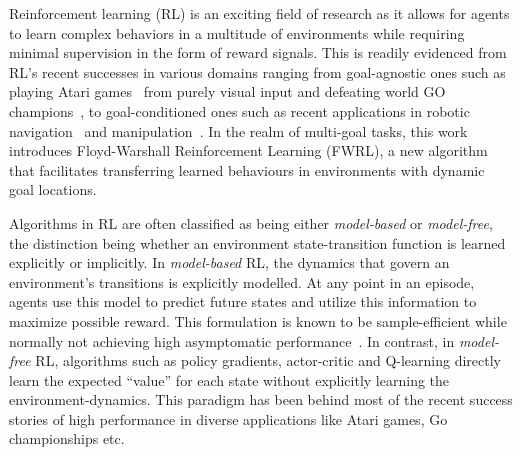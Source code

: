 Reinforcement learning (RL) is an exciting field of research as it allows for
agents to learn complex behaviors in a multitude of environments while requiring
minimal supervision in the form of reward signals. This is readily
evidenced from RL's recent successes in various domains ranging from goal-agnostic ones such as  
playing Atari games~\cite{MnKaSiNATURE2015} from purely visual input and defeating world GO
champions~\cite{gibney2016google}, to goal-conditioned ones such as recent
applications in robotic navigation~\cite{mirowski2018learning} and
manipulation~\cite{pong2018temporal}. In the realm of multi-goal tasks, this
work introduces Floyd-Warshall Reinforcement Learning (FWRL), a new algorithm
that facilitates transferring learned behaviours in environments with dynamic goal
locations.


Algorithms in RL are often classified as being either
\emph{model-based} or \emph{model-free}, the distinction being whether
an environment state-transition function is learned explicitly or
implicitly.  In \emph{model-based} RL, the dynamics that govern an
environment's transitions is explicitly modelled.
At any point in an episode, agents use this model to
predict future states and utilize this information to maximize possible
reward. This formulation is known to be sample-efficient while normally
not achieving high asymptomatic performance~\cite{pong2018temporal}.
In contrast, in \emph{model-free} RL, algorithms such as policy gradients,
actor-critic and Q-learning directly learn the expected ``value'' for each
state without explicitly learning the environment-dynamics. This paradigm has
been behind most of the recent success stories of high performance in diverse
applications like Atari games, Go championships etc.

